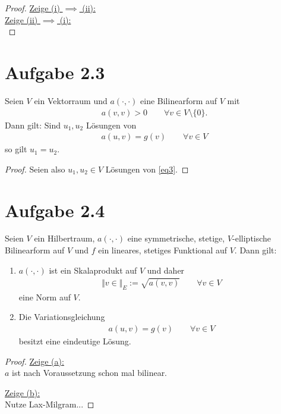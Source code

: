 \documentclass[12pt,a4paper]{article}
\begin{document}
\begin{proof}
\underline{Zeige (i) $\implies$ (ii):}\\

\underline{Zeige (ii) $\implies$ (i):}\\

\end{proof}

\section*{Aufgabe 2.3}
Seien $V$ ein Vektorraum und $a(\cdot,\cdot)$ eine Bilinearform auf $V$ mit
\begin{align*}
a(v,v)>0\qquad\forall v\in V\setminus\lbrace0\rbrace.
\end{align*}
Dann gilt: Sind $u_1,u_2$ Lösungen von
\begin{align}\label{eq3}
a(u,v)=g(v)\qquad\forall v\in V
\end{align}
so gilt $u_1=u_2$.

\begin{proof}
Seien also $u_1,u_2\in V$ Lösungen von \eqref{eq3}. 


\end{proof}


\section*{Aufgabe 2.4}
Seien $V$ ein Hilbertraum, $a(\cdot,\cdot)$ eine symmetrische, stetige, $V$-elliptische Bilinearform auf $V$ und $f$ ein lineares, stetiges Funktional auf $V$. Dann gilt:

\begin{enumerate}[label=(\alph*)]
\item $a(\cdot,\cdot)$ ist ein Skalaprodukt auf $V$ und daher
\begin{align*}
\Vert v\in\Vert_E:=\sqrt{a(v,v)}\qquad\forall v\in V
\end{align*}
eine Norm auf $V$.
\item Die Variationsgleichung
\begin{align*}
a(u,v)=g(v)\qquad\forall v\in V
\end{align*}
besitzt eine eindeutige Lösung.
\end{enumerate}
\begin{proof}
\underline{Zeige (a):}\\
$a$ ist nach Voraussetzung schon mal bilinear.

\underline{Zeige (b):}\\
Nutze Lax-Milgram...

\end{proof}
\end{document}
